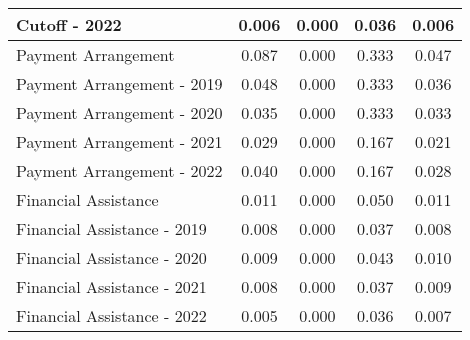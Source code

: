 \begin{tabular}{l|c|c|c|c}
\quad Cutoff - 2022 & 0.006 & 0.000 & 0.036 & 0.006 \\
\midrule 
Payment Arrangement & 0.087 & 0.000 & 0.333 & 0.047 \\
\quad Payment Arrangement - 2019 & 0.048 & 0.000 & 0.333 & 0.036 \\
\quad Payment Arrangement - 2020 & 0.035 & 0.000 & 0.333 & 0.033 \\
\quad Payment Arrangement - 2021 & 0.029 & 0.000 & 0.167 & 0.021 \\
\quad Payment Arrangement - 2022 & 0.040 & 0.000 & 0.167 & 0.028 \\
\midrule 
Financial Assistance & 0.011 & 0.000 & 0.050 & 0.011 \\
\quad Financial Assistance - 2019 & 0.008 & 0.000 & 0.037 & 0.008 \\
\quad Financial Assistance - 2020 & 0.009 & 0.000 & 0.043 & 0.010 \\
\quad Financial Assistance - 2021 & 0.008 & 0.000 & 0.037 & 0.009 \\
\quad Financial Assistance - 2022 & 0.005 & 0.000 & 0.036 & 0.007 \\
\midrule 
\bottomrule 
\end{tabular}
